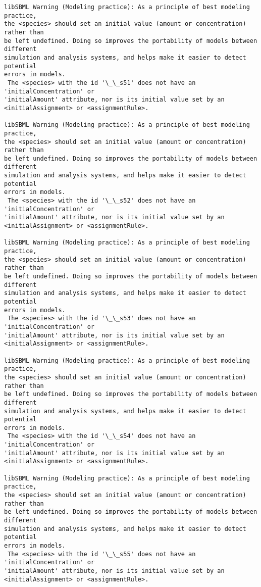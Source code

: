 \documentclass[11pt]{article}
\begin{document}
\begin{Verbatim}[commandchars=\\\{\}]
libSBML Warning (Modeling practice): As a principle of best modeling practice,
the <species> should set an initial value (amount or concentration) rather than
be left undefined. Doing so improves the portability of models between different
simulation and analysis systems, and helps make it easier to detect potential
errors in models.
 The <species> with the id '\_\_s51' does not have an 'initialConcentration' or
'initialAmount' attribute, nor is its initial value set by an
<initialAssignment> or <assignmentRule>.

libSBML Warning (Modeling practice): As a principle of best modeling practice,
the <species> should set an initial value (amount or concentration) rather than
be left undefined. Doing so improves the portability of models between different
simulation and analysis systems, and helps make it easier to detect potential
errors in models.
 The <species> with the id '\_\_s52' does not have an 'initialConcentration' or
'initialAmount' attribute, nor is its initial value set by an
<initialAssignment> or <assignmentRule>.

libSBML Warning (Modeling practice): As a principle of best modeling practice,
the <species> should set an initial value (amount or concentration) rather than
be left undefined. Doing so improves the portability of models between different
simulation and analysis systems, and helps make it easier to detect potential
errors in models.
 The <species> with the id '\_\_s53' does not have an 'initialConcentration' or
'initialAmount' attribute, nor is its initial value set by an
<initialAssignment> or <assignmentRule>.

libSBML Warning (Modeling practice): As a principle of best modeling practice,
the <species> should set an initial value (amount or concentration) rather than
be left undefined. Doing so improves the portability of models between different
simulation and analysis systems, and helps make it easier to detect potential
errors in models.
 The <species> with the id '\_\_s54' does not have an 'initialConcentration' or
'initialAmount' attribute, nor is its initial value set by an
<initialAssignment> or <assignmentRule>.

libSBML Warning (Modeling practice): As a principle of best modeling practice,
the <species> should set an initial value (amount or concentration) rather than
be left undefined. Doing so improves the portability of models between different
simulation and analysis systems, and helps make it easier to detect potential
errors in models.
 The <species> with the id '\_\_s55' does not have an 'initialConcentration' or
'initialAmount' attribute, nor is its initial value set by an
<initialAssignment> or <assignmentRule>.


\end{Verbatim}
\end{document}
